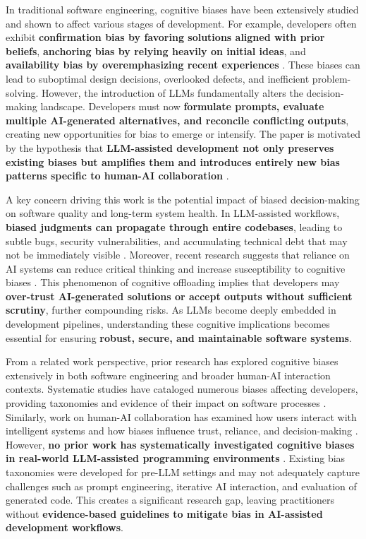 In traditional software engineering, cognitive biases have been extensively studied and shown to affect various stages of development. For example, developers often exhibit \textbf{confirmation bias by favoring solutions aligned with prior beliefs}, \textbf{anchoring bias by relying heavily on initial ideas}, and \textbf{availability bias by overemphasizing recent experiences} \cite{mohanani2018cognitive, chattopadhyay2020cognitive}. These biases can lead to suboptimal design decisions, overlooked defects, and inefficient problem-solving. However, the introduction of LLMs fundamentally alters the decision-making landscape. Developers must now \textbf{formulate prompts, evaluate multiple AI-generated alternatives, and reconcile conflicting outputs}, creating new opportunities for bias to emerge or intensify. The paper is motivated by the hypothesis that \textbf{LLM-assisted development not only preserves existing biases but amplifies them and introduces entirely new bias patterns specific to human-AI collaboration} .

A key concern driving this work is the potential impact of biased decision-making on software quality and long-term system health. In LLM-assisted workflows, \textbf{biased judgments can propagate through entire codebases}, leading to subtle bugs, security vulnerabilities, and accumulating technical debt that may not be immediately visible . Moreover, recent research suggests that reliance on AI systems can reduce critical thinking and increase susceptibility to cognitive biases \cite{lee2025impact}. This phenomenon of cognitive offloading implies that developers may \textbf{over-trust AI-generated solutions or accept outputs without sufficient scrutiny}, further compounding risks. As LLMs become deeply embedded in development pipelines, understanding these cognitive implications becomes essential for ensuring \textbf{robust, secure, and maintainable software systems}.

From a related work perspective, prior research has explored cognitive biases extensively in both software engineering and broader human-AI interaction contexts. Systematic studies have cataloged numerous biases affecting developers, providing taxonomies and evidence of their impact on software processes \cite{mohanani2018cognitive}. Similarly, work on human-AI collaboration has examined how users interact with intelligent systems and how biases influence trust, reliance, and decision-making \cite{lee2025impact}. However, \textbf{no prior work has systematically investigated cognitive biases in real-world LLM-assisted programming environments} . Existing bias taxonomies were developed for pre-LLM settings and may not adequately capture challenges such as prompt engineering, iterative AI interaction, and evaluation of generated code. This creates a significant research gap, leaving practitioners without \textbf{evidence-based guidelines to mitigate bias in AI-assisted development workflows}.

